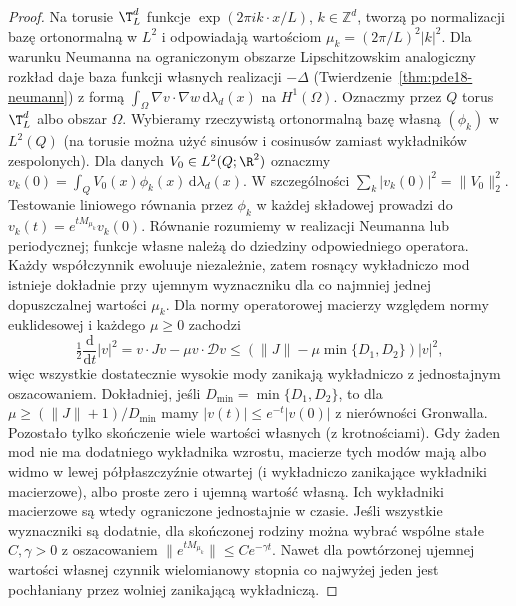 \begin{proof}
Na torusie $\T_L^d$ funkcje
$\exp(2\pi i k\cdot x/L)$, $k\in\mathbb Z^d$,
tworzą po normalizacji bazę ortonormalną w $L^2$
i odpowiadają wartościom
$\mu_k=(2\pi/L)^2|k|^2$. Dla warunku Neumanna
na ograniczonym obszarze Lipschitzowskim analogiczny
rozkład daje baza funkcji własnych realizacji $-\Delta$
(Twierdzenie~\ref{thm:pde18-neumann})
z formą $\int_\Omega\nabla v\cdot\nabla w\,
\mathrm d\lambda_d(x)$ na $H^1(\Omega)$.
Oznaczmy przez $Q$ torus $\T_L^d$ albo obszar $\Omega$.
Wybieramy rzeczywistą ortonormalną bazę własną
$(\phi_k)$ w $L^2(Q)$ (na torusie można użyć
sinusów i cosinusów zamiast wykładników zespolonych).
Dla danych $V_0\in L^2(Q;\R^2)$ oznaczmy
$v_k(0)=\int_Q V_0(x)\phi_k(x)\,\mathrm d\lambda_d(x)$.
W szczególności $\sum_k|v_k(0)|^2=\|V_0\|_2^2$.
Testowanie liniowego równania przez $\phi_k$
w każdej składowej prowadzi do
$v_k(t)=e^{tM_{\mu_k}}v_k(0)$.
Równanie rozumiemy w realizacji Neumanna
lub periodycznej; funkcje własne należą do
dziedziny odpowiedniego operatora.
Każdy współczynnik ewoluuje niezależnie, zatem
rosnący wykładniczo
mod istnieje dokładnie przy ujemnym wyznaczniku
dla co najmniej jednej dopuszczalnej wartości $\mu_k$.
Dla normy operatorowej macierzy względem normy
euklidesowej i każdego $\mu\ge0$ zachodzi
\[
 \tfrac12\frac{\mathrm d}{\mathrm dt}|v|^2
 =v\cdot Jv-\mu v\cdot\mathcal D v
 \le(\|J\|-\mu\min\{D_1,D_2\})|v|^2,
\]
więc wszystkie dostatecznie wysokie mody
zanikają wykładniczo z jednostajnym oszacowaniem.
Dokładniej, jeśli $D_{\min}=\min\{D_1,D_2\}$,
to dla $\mu\ge(\|J\|+1)/D_{\min}$ mamy
$|v(t)|\le e^{-t}|v(0)|$ z nierówności Gronwalla.
Pozostało tylko skończenie wiele wartości własnych
(z krotnościami). Gdy żaden mod nie ma dodatniego
wykładnika wzrostu, macierze tych modów mają
albo widmo w lewej półpłaszczyźnie otwartej
(i wykładniczo zanikające wykładniki macierzowe),
albo proste zero i ujemną wartość własną.
Ich wykładniki macierzowe są wtedy ograniczone
jednostajnie w czasie. Jeśli wszystkie wyznaczniki
są dodatnie, dla skończonej rodziny można wybrać
wspólne stałe $C,\gamma>0$ z oszacowaniem
$\|e^{tM_{\mu_k}}\|\le Ce^{-\gamma t}$.
Nawet dla powtórzonej ujemnej wartości własnej
czynnik wielomianowy stopnia co najwyżej jeden
jest pochłaniany przez wolniej zanikającą wykładniczą.


\end{proof}

